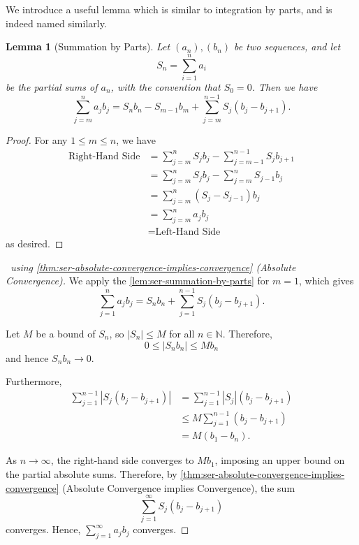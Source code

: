 \documentclass[11pt]{article}
\numberwithin{equation}{section}
\newtheorem{lemma}[theorem]{Lemma}
\theoremstyle{definition}
\theoremstyle{remark}
\newcommand{\pqty}[1]{\left(#1\right)}
\newcommand{\abs}[1]{\left|#1\right|}
\newcommand{\NN}{\mathbb N}
\begin{document}
We introduce a useful lemma which is similar to integration by parts, and is indeed named similarly.

\begin{lemma}[Summation by Parts]\label{analysis-unit-0062}
    \label{lem:ser-summation-by-parts}%
    Let \(\pqty{a_n}, \pqty{b_n}\) be two sequences, and let
    \[
        S_n = \sum_{i = 1}^{n} a_i
    \]
    be the partial sums of \(a_n\), with the convention that \(S_0 = 0\). Then we have
    \[
        \sum_{j = m}^{n} a_j b_j = S_n b_n - S_{m - 1} b_m + \sum_{j = m}^{n - 1} S_j \pqty{b_j - b_{j + 1}}.
    \]
\end{lemma}

\begin{proof}
    For any \(1 \leq m \leq n\), we have
    \begin{align*}
        \text{Right-Hand Side} &= \sum_{j = m}^{n} S_j b_j - \sum_{j = m - 1}^{n - 1} S_j b_{j + 1} \\
        &= \sum_{j = m}^{n} S_j b_j - \sum_{j = m}^{n} S_{j - 1} b_j \\
        &= \sum_{j = m}^{n} \pqty{S_j - S_{j - 1}} b_j \\
        &= \sum_{j = m}^{n} a_j b_j \\
        &= \text{Left-Hand Side}
    \end{align*}
    as desired.
\end{proof}

\begin{proof}[\proofname\ using \autoref{thm:ser-absolute-convergence-implies-convergence} (Absolute Convergence)]
    We apply the \autoref{lem:ser-summation-by-parts} for \(m = 1\), which gives
    \[
        \sum_{j = 1}^{n} a_j b_j = S_n b_n + \sum_{j = 1}^{n - 1} S_j \pqty{b_j - b_{j + 1}}.
    \]

    Let \(M\) be a bound of \(S_n\), so \(\abs{S_n} \leq M\) for all \(n \in \NN\). Therefore,
    \[
        0 \leq \abs{S_n b_n} \leq M b_n
    \]
    and hence \(S_n b_n \to 0\).

    Furthermore,
    \begin{align*}
        \sum_{j = 1}^{n - 1} \abs{S_j \pqty{b_j - b_{j + 1}}} &= \sum_{j = 1}^{n - 1} \abs{S_j} \pqty{b_j - b_{j + 1}} \\
        &\leq M \sum_{j = 1}^{n - 1} \pqty{b_j - b_{j + 1}} \\
        &= M \pqty{b_1 - b_n}.
    \end{align*}

    As \(n \to \infty\), the right-hand side converges to \(M b_1\), imposing an upper bound on the partial absolute sums. Therefore, by \autoref{thm:ser-absolute-convergence-implies-convergence} (Absolute Convergence implies Convergence), the sum
    \[
        \sum_{j = 1}^{\infty} S_j \pqty{b_j - b_{j + 1}}
    \]
    converges. Hence, \(\sum_{j = 1}^{\infty} a_j b_j\) converges.
\end{proof}
\end{document}
